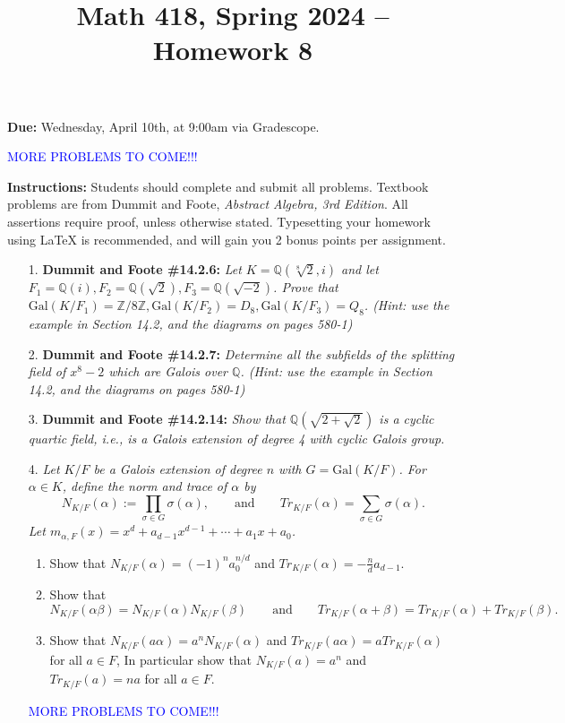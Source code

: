 \documentclass[12pt]{article}
\title{Math 418, Spring 2024 -- Homework 8}
\date{}
\newcommand{\Z}{\mathbb{Z}}
\newcommand{\Q}{\mathbb{Q}}
\newcommand{\Gal}{\text{Gal}}
\begin{document}
 \maketitle
\vspace{-80pt}

\textbf{Due:} Wednesday, April 10th, at 9:00am via Gradescope.

\textcolor{blue}{MORE PROBLEMS TO COME!!!}

\textbf{Instructions:} Students should complete and submit all problems. Textbook problems are from Dummit and Foote, \emph{Abstract Algebra, 3rd Edition}. All assertions require proof, unless otherwise stated. Typesetting your homework using LaTeX is recommended, and will gain you 2 bonus points per assignment.

\begin{enumerate}

\item[1.] \textbf{Dummit and Foote \#14.2.6:} \textit{Let $K = \Q(\sqrt[8]{2}, i)$ and let $F_1 = \Q(i), F_2 = \Q(\sqrt{2}) , F_3 = \Q(\sqrt{-2})$. Prove that $\Gal(K/F_1) = \Z/8\Z, \Gal(K/F_2) = D_8, \Gal(K/F_3) = Q_8$. (Hint: use the example in Section 14.2, and the diagrams on pages 580-1)}

\item[2.] \textbf{Dummit and Foote \#14.2.7:} \textit{Determine all the subfields of the splitting field of $x^8 - 2$ which are Galois over $\Q$. (Hint: use the example in Section 14.2, and the diagrams on pages 580-1)}

\item[3.] \textbf{Dummit and Foote \#14.2.14:} \textit{Show that $\Q(\sqrt{2+\sqrt{2}})$ is a cyclic quartic field, i.e., is a Galois extension of degree 4 with
cyclic Galois group.}

\item[4.] \textit{Let $K/F$ be a Galois extension of degree $n$ with $G = \Gal(K/F)$. For $\alpha\in K$, define the norm and trace of $\alpha$ by \[N_{K/F}(\alpha) := \prod_{\sigma\in G} \sigma(\alpha), \qquad \text{and} \qquad Tr_{K/F}(\alpha) = \sum_{\sigma\in G} \sigma(\alpha).\] Let $m_{\alpha,F}(x) = x^d + a_{d-1}x^{d-1} + \cdots + a_1x + a_0$.}

\begin{enumerate}
    \item Show that $N_{K/F}(\alpha) = (-1)^n a_0^{n/d}$ and $Tr_{K/F}(\alpha) = -\frac{n}{d}a_{d-1}$.

    \item Show that \[N_{K/F}(\alpha\beta) = N_{K/F}(\alpha)N_{K/F}(\beta)\qquad \text{and} \qquad Tr_{K/F}(\alpha+\beta) = Tr_{K/F}(\alpha)+Tr_{K/F}(\beta).\]

    \item Show that $N_{K/F}(a\alpha) = a^n N_{K/F}(\alpha)$ and $Tr_{K/F}(a\alpha) = aTr_{K/F}(\alpha)$ for all $a\in F$, In particular show that $N_{K/F}(a) = a^n$ and $Tr_{K/F}(a) = na$ for all $a\in F$.
\end{enumerate}

\textcolor{blue}{MORE PROBLEMS TO COME!!!}

\end{enumerate}
\end{document}
